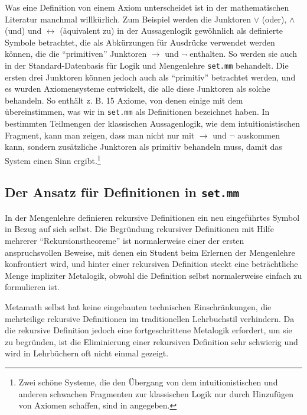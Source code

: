 Was eine Definition von einem Axiom unterscheidet ist in der mathe\-ma\-tischen Literatur manchmal willkürlich.  Zum Beispiel werden die Junktoren $\vee$ ({\sc oder}), $\wedge$ ({\sc und}) und $\leftrightarrow$ (äquivalent zu) in der Aussagenlogik gewöhnlich als definierte Symbole betrachtet, die als Abkürzungen für Ausdrücke verwendet werden können, die die "`primitiven"' Junktoren $\rightarrow$ und $\neg$ enthalten.  So werden sie auch in der Standard-Datenbasis für Logik und Mengenlehre \texttt{set.mm} behandelt.  Die ersten drei Junktoren können jedoch auch als "`primitiv"' betrachtet werden, und es wurden Axiomensysteme entwickelt, die alle diese Junktoren als solche behandeln.  So enthält z. B. \cite[S.~35]{Goodstein} 15 Axiome, von denen einige mit dem übereinstimmen, was wir in \texttt{set.mm} als Definitionen bezeichnet haben.  In bestimmten Teilmengen der klassischen Aussagenlogik, wie dem intuitionistischen Fragment, kann man zeigen, dass man nicht nur mit $\rightarrow$ und $\neg$ auskommen kann, sondern zusätzliche Junktoren als primitiv behandeln muss, damit das System einen Sinn ergibt.\footnote{Zwei schöne Systeme, die den Übergang von dem intuitionistischen und anderen schwachen Fragmenten zur klassischen Logik nur durch Hinzufügen von Axiomen schaffen, sind in \cite{Robinsont} angegeben.}

\subsection{Der Ansatz für Definitionen in \texttt{set.mm}}

In der Mengenlehre definieren rekursive Definitionen ein neu eingeführtes Symbol in Bezug auf sich selbst. Die Begründung rekursiver Definitionen mit Hilfe mehrerer "`Rekursionstheoreme"' ist normalerweise einer der ersten anspruchsvollen Beweise, mit denen ein Student beim Erlernen der Mengenlehre konfrontiert wird, und hinter einer rekursiven Definition steckt eine beträchtliche Menge impliziter Metalogik, obwohl die Definition selbst normalerweise einfach zu formulieren ist.

Metamath selbst hat keine eingebauten technischen Einschränkungen, die mehrteilige rekursive Definitionen im traditionellen Lehrbuchstil verhindern. Da die rekursive Definition jedoch eine fortgeschrittene Metalogik erfordert, um sie zu begründen, ist die Eliminierung einer rekursiven Definition sehr schwierig und wird in Lehrbüchern oft nicht einmal gezeigt.

